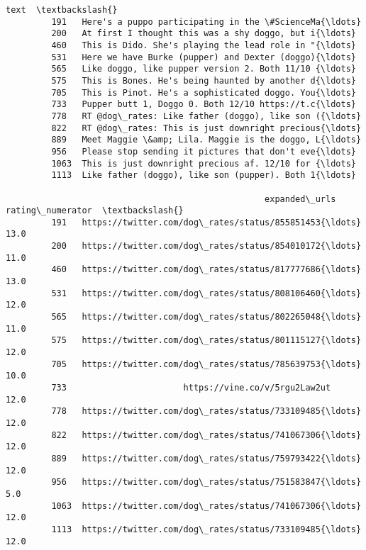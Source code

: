 \documentclass[11pt]{article}
\begin{document}
\begin{Verbatim}[commandchars=\\\{\}]
                                                            text  \textbackslash{}
         191   Here's a puppo participating in the \#ScienceMa{\ldots}   
         200   At first I thought this was a shy doggo, but i{\ldots}   
         460   This is Dido. She's playing the lead role in "{\ldots}   
         531   Here we have Burke (pupper) and Dexter (doggo){\ldots}   
         565   Like doggo, like pupper version 2. Both 11/10 {\ldots}   
         575   This is Bones. He's being haunted by another d{\ldots}   
         705   This is Pinot. He's a sophisticated doggo. You{\ldots}   
         733   Pupper butt 1, Doggo 0. Both 12/10 https://t.c{\ldots}   
         778   RT @dog\_rates: Like father (doggo), like son ({\ldots}   
         822   RT @dog\_rates: This is just downright precious{\ldots}   
         889   Meet Maggie \&amp; Lila. Maggie is the doggo, L{\ldots}   
         956   Please stop sending it pictures that don't eve{\ldots}   
         1063  This is just downright precious af. 12/10 for {\ldots}   
         1113  Like father (doggo), like son (pupper). Both 1{\ldots}   
         
                                                   expanded\_urls  rating\_numerator  \textbackslash{}
         191   https://twitter.com/dog\_rates/status/855851453{\ldots}              13.0   
         200   https://twitter.com/dog\_rates/status/854010172{\ldots}              11.0   
         460   https://twitter.com/dog\_rates/status/817777686{\ldots}              13.0   
         531   https://twitter.com/dog\_rates/status/808106460{\ldots}              12.0   
         565   https://twitter.com/dog\_rates/status/802265048{\ldots}              11.0   
         575   https://twitter.com/dog\_rates/status/801115127{\ldots}              12.0   
         705   https://twitter.com/dog\_rates/status/785639753{\ldots}              10.0   
         733                       https://vine.co/v/5rgu2Law2ut              12.0   
         778   https://twitter.com/dog\_rates/status/733109485{\ldots}              12.0   
         822   https://twitter.com/dog\_rates/status/741067306{\ldots}              12.0   
         889   https://twitter.com/dog\_rates/status/759793422{\ldots}              12.0   
         956   https://twitter.com/dog\_rates/status/751583847{\ldots}               5.0   
         1063  https://twitter.com/dog\_rates/status/741067306{\ldots}              12.0   
         1113  https://twitter.com/dog\_rates/status/733109485{\ldots}              12.0   
         

\end{Verbatim}
\end{document}
